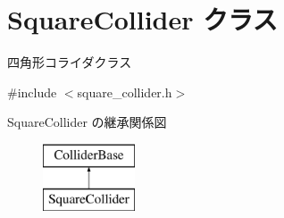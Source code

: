 \hypertarget{class_square_collider}{}\section{Square\+Collider クラス}
\label{class_square_collider}


四角形コライダクラス  




{\ttfamily \#include $<$square\+\_\+collider.\+h$>$}

Square\+Collider の継承関係図\begin{figure}[H]
\begin{center}
\leavevmode
\includegraphics[height=2.000000cm]{class_square_collider}
\end{center}
\end{figure}
